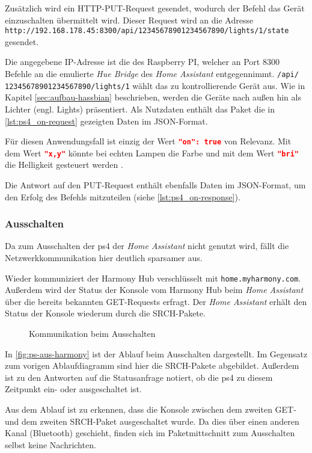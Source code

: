 Zusätzlich wird ein HTTP-PUT-Request gesendet, wodurch der Befehl das Gerät einzuschalten übermittelt wird.
Dieser Request wird an die Adresse \nolinkurl{http://192.168.178.45:8300/api/12345678901234567890/lights/1/state} gesendet.

Die angegebene IP-Adresse ist die des Raspberry PI, welcher an Port 8300 Befehle an die emulierte \textit{Hue Bridge} des \textit{Home Assistant} entgegennimmt.
\texttt{/api/\\12345678901234567890/lights/1} wählt das zu kontrollierende Gerät aus.
Wie in Kapitel \ref{sec:aufbau-hassbian} beschrieben, werden die Geräte nach außen hin als Lichter (engl. Lights) präsentiert.
Als Nutzdaten enthält das Paket die in \autoref{lst:ps4_on-request} gezeigten Daten im JSON-Format.



Für diesen Anwendungsfall ist einzig der Wert \lstinline[language=json]{"on": true} von Relevanz.
Mit dem Wert \lstinline[language=json]{"x,y"} könnte bei echten Lampen die Farbe
und mit dem Wert \lstinline[language=json]{"bri"} die Helligkeit gesteuert werden \cite{Coreconc26:online}.


Die Antwort auf den PUT-Request enthält ebenfalls Daten im JSON-Format,
um den Erfolg des Befehls mitzuteilen (siehe \autoref{lst:ps4_on-response}).


\newpage
\subsubsection{Ausschalten}
Da zum Ausschalten der \ac{ps4} der \textit{Home Assistant} nicht genutzt wird,
fällt die Netzwerkkommunikation hier deutlich sparsamer aus.

Wieder kommuniziert der Harmony Hub verschlüsselt mit \nolinkurl{home.myharmony.com}.
Außerdem wird der Status der Konsole vom Harmony Hub beim \textit{Home Assistant} über die bereits bekannten GET-Requests erfragt.
Der \textit{Home Assistant} erhält den Status der Konsole wiederum durch die SRCH-Pakete.

\begin{figure}[ht!]
    \centering
    \resizebox{\textwidth}{!}{
        
    }
    \caption{Kommunikation beim Ausschalten}
    \label{fig:ps-aus-harmony}
\end{figure}

In \autoref{fig:ps-aus-harmony} ist der Ablauf beim Ausschalten dargestellt.
Im Gegensatz zum vorigen Ablaufdiagramm sind hier die SRCH-Pakete abgebildet.
Außerdem ist zu den Antworten auf die Statusanfrage notiert,
ob die \ac{ps4} zu diesem Zeitpunkt ein- oder ausgeschaltet ist.

Aus dem Ablauf ist zu erkennen,
dass die Konsole zwischen dem zweiten GET- und dem zweiten SRCH-Paket ausgeschaltet wurde.
Da dies über einen anderen Kanal (Bluetooth) geschieht,
finden sich im Paketmittschnitt zum Ausschalten selbst keine Nachrichten.